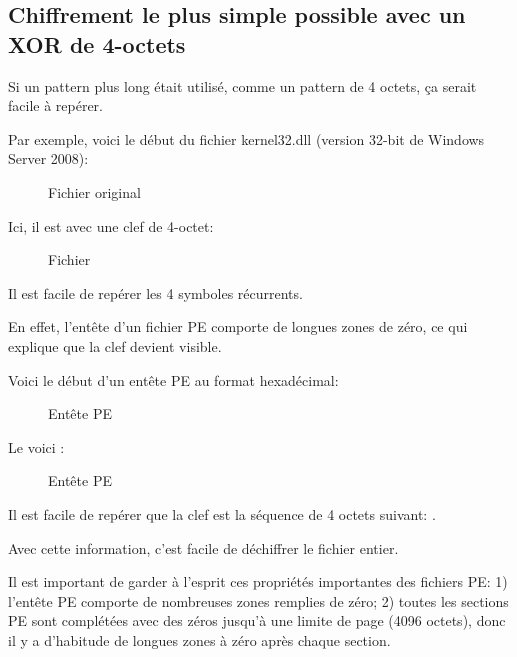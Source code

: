 \clearpage
\subsection{Chiffrement le plus simple possible avec un XOR de 4-octets}

Si un pattern plus long était utilisé, comme un pattern de 4 octets, ça serait
facile à repérer.

Par exemple, voici le début du fichier kernel32.dll (version 32-bit de Windows Server
2008):

\begin{figure}[H]
\centering
{}
\caption{Fichier original}
\end{figure}

\clearpage

Ici, il est  avec une clef de 4-octet:

\begin{figure}[H]
\centering
{}
\caption{Fichier }
\end{figure}

Il est facile de repérer les 4 symboles récurrents.

En effet, l'entête d'un fichier PE comporte de longues zones de zéro, ce qui explique
que la clef devient visible.

\clearpage

Voici le début d'un entête PE au format hexadécimal:

\begin{figure}[H]
\centering
{}
\caption{Entête PE}
\end{figure}

\clearpage

Le voici :

\begin{figure}[H]
\centering
{}
\caption{Entête PE }
\end{figure}

Il est facile de repérer que la clef est la séquence de 4 octets suivant: .

Avec cette information, c'est facile de déchiffrer le fichier entier.

Il est important de garder à l'esprit ces propriétés importantes des fichiers PE:
1) l'entête PE comporte de nombreuses zones remplies de zéro;
2) toutes les sections PE sont complétées avec des zéros jusqu'à une limite de page
(4096 octets),
donc il y a d'habitude de longues zones à zéro après chaque section.

